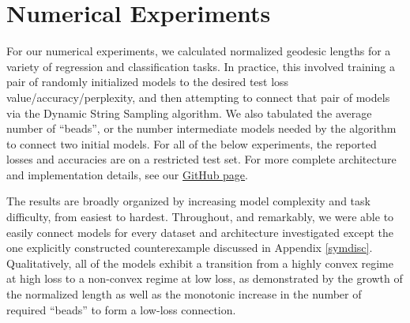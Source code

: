 
 
 
 
 
\section{Numerical Experiments}
\label{sec:NumExp}

For our numerical experiments, we calculated normalized geodesic lengths for a variety of regression and classification tasks.  In practice, this involved training a pair of randomly initialized models to the desired test loss value/accuracy/perplexity, and then attempting to connect that pair of models via the Dynamic String Sampling algorithm.  We also tabulated the average number of ``beads'', or the number intermediate models needed by the algorithm to connect two initial models.  For all of the below experiments, the reported losses and accuracies are on a restricted test set.  For more complete architecture and implementation details, see our \href{github.com/danielfreeman11/convex-nets}{GitHub page}.


The results are broadly organized by increasing model complexity and task difficulty, from easiest to hardest.  Throughout, and remarkably, we were able to easily connect models for every dataset and architecture investigated except the one explicitly constructed counterexample discussed in Appendix \ref{symdisc}.  Qualitatively, all of the models exhibit a transition from a highly convex regime at high loss to a non-convex regime at low loss, as demonstrated by the growth of the normalized length as well as the monotonic increase in the number of required ``beads'' to form a low-loss connection.







